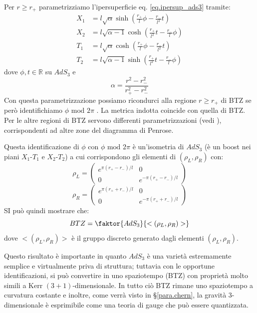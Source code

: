Per $r \geq r_+$ parametrizziamo l'ipersuperficie eq. \ref{eq.ipersup_ads3} tramite:
\begin{align*}
    X_1 &= l\sqrt{\alpha}\sinh(\frac{r_+}{l}\phi - \frac{r_-}{l^2}t) \\
    X_2 &= l\sqrt{\alpha - 1}\cosh( \frac{r_+}{l^2}t - \frac{r_-}{l}\phi) \\
    T_1 &= l\sqrt{\alpha}\cosh(\frac{r_+}{l}\phi - \frac{r_-}{l^2}t)\\
    T_2 &= l\sqrt{\alpha - 1} \sinh(\frac{r_+}{l^2}t - \frac{r_-}{l}\phi)
\end{align*}
dove $\phi, t \in \mathbb R$ su $AdS_3$ e 
\begin{equation*}
    \alpha = \frac{r^2 - r_-^2}{r_+^2 - r_-^2}
\end{equation*}
Con questa parametrizzazione possiamo ricondurci alla regione $r\geq r_+ $ di BTZ se però identifichiamo $\phi \textrm{ mod } 2\pi$ . La metrica indotta coincide con quella di BTZ. Per le altre regioni di BTZ servono differenti parametrizzazioni (vedi \cite{btz}), corrispondenti ad altre zone del diagramma di Penrose.

Questa identificazione di $\phi$ con $\phi \textrm{ mod } 2\pi$ è un'isometria di $AdS_3$ (è un boost nei piani $X_1$-$T_1$ e $X_2$-$T_2$) a cui corrispondono gli elementi di $(\rho_L, \rho_R)$ con:
\begin{equation*}
    \rho_L = \begin{pmatrix}
        e^{\pi(r_+-r_-)/l} & 0 \\
        0 & e^{-\pi(r_+-r_-)/l}
    \end{pmatrix}
\end{equation*}
\begin{equation*}
    \rho_R = \begin{pmatrix}
        e^{\pi(r_+ + r_-)/l} & 0 \\
        0 & e^{-\pi(r_+ + r_-)/l}
    \end{pmatrix}
\end{equation*}
SI può quindi mostrare che:
\begin{equation*}
    BTZ = \faktor{AdS_3}{<(\rho_L,\rho_R)>}
\end{equation*}
dove $<(\rho_L,\rho_R)>$ è il gruppo discreto generato dagli elementi $(\rho_L,\rho_R)$.

Questo risultato è importante in quanto $AdS_3$ è una varietà estremamente semplice e virtualmente priva di struttura; tuttavia con le opportune identificazioni, si può convertire in uno spaziotempo (BTZ) con proprietà molto simili a Kerr $(3+1)$-dimensionale. In tutto ciò BTZ rimane uno spaziotempo a curvatura costante e inoltre, come verrà visto in \S\ref{para.chern}, la gravità 3-dimensionale è esprimibile come una teoria di gauge che può essere quantizzata.